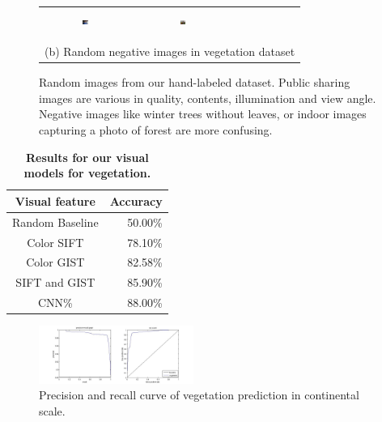 \begin{figure}[th!]
{{\begin{center}
\begin{tabular}{@{}c@{\,\,\,}c@{\,\,\,}c@{\,\,\,}c@{\,\,\,}c@{\,\,\,}}
\includegraphics[width=0.06\textwidth, height=0.35in]{imggrid/datasetnega/9.jpg} &
\includegraphics[width=0.06\textwidth, height=0.35in]{imggrid/datasetnega/10.jpg} \\
\multicolumn{5}{c}{(b) Random negative images in vegetation dataset} \\
\end{tabular}
\end{center}
}}
\vspace{-6pt}
\caption{Random images from our hand-labeled dataset. Public sharing images are various in quality, contents, illumination and view angle.
Negative images like winter trees without leaves, or indoor images capturing a photo of forest are more confusing.}
\label{fig:dataset}
\end{figure}

\begin{table}[th!]
\centering
\caption {\textbf{Results for our visual models for vegetation.}}
\label{tab:veg_img_classifier} 
\tiny
\begin{tabular}{@{}cr@{}}\toprule
Visual feature &  Accuracy\\\midrule
Random Baseline & 50.00\%\\
Color SIFT & 78.10\%\\
Color GIST & 82.58\% \\
SIFT and GIST& 85.90\% \\
CNN\% &  88.00\%\\
\bottomrule
\end{tabular}
\end{table}

\begin{figure}[th!]
\begin{center}
\includegraphics[width=0.45\textwidth]{figure/curvevege.jpg}
\end{center}
\vspace{-6pt}
\addvspace{2mm}
\caption{Precision and recall curve of vegetation prediction in continental scale.}
\label{fig:curvevege}
\vspace{-6pt}
\end{figure}
\addvspace{5mm}

